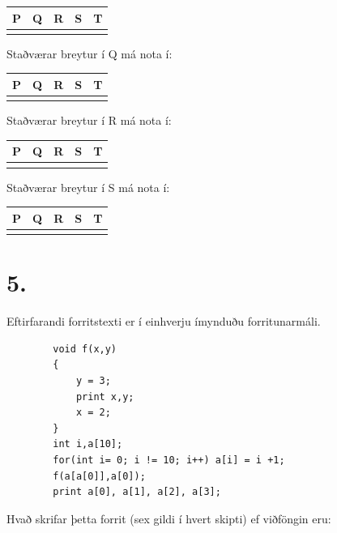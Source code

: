 \documentclass{article}
\begin{document}
     
     \begin{tabularx}{\textwidth}{ |X|X|X|X|X|}
        \hline
        \textbf{P}  & \textbf{Q}  & \textbf{R}  & \textbf{S}  & \textbf{T} \\ \hline
         & & & & \\ \hline
     \end{tabularx}


     Staðværar breytur í Q má nota í:

     
     \begin{tabularx}{\textwidth}{ |X|X|X|X|X|}
        \hline
        \textbf{P}  & \textbf{Q}  & \textbf{R}  & \textbf{S}  & \textbf{T} \\ \hline
         & & & & \\ \hline
     \end{tabularx}


     Staðværar breytur í R má nota í:

     
     \begin{tabularx}{\textwidth}{ |X|X|X|X|X|}
        \hline
        \textbf{P}  & \textbf{Q}  & \textbf{R}  & \textbf{S}  & \textbf{T} \\ \hline
         & & & & \\ \hline
     \end{tabularx}



     Staðværar breytur í S má nota í:

     
     \begin{tabularx}{\textwidth}{ |X|X|X|X|X|}
        \hline
        \textbf{P}  & \textbf{Q}  & \textbf{R}  & \textbf{S}  & \textbf{T} \\ \hline
         & & & & \\ \hline
     \end{tabularx}


     \newpage

     \section{5.}
     Eftirfarandi forritstexti er í einhverju ímynduðu forritunarmáli.
     \begin{verbatim}
        void f(x,y)
        {
            y = 3;
            print x,y;
            x = 2;
        }
        int i,a[10];
        for(int i= 0; i != 10; i++) a[i] = i +1;
        f(a[a[0]],a[0]);
        print a[0], a[1], a[2], a[3];
     \end{verbatim}

     Hvað skrifar þetta forrit (sex gildi í hvert skipti) ef viðföngin eru:
\end{document}
